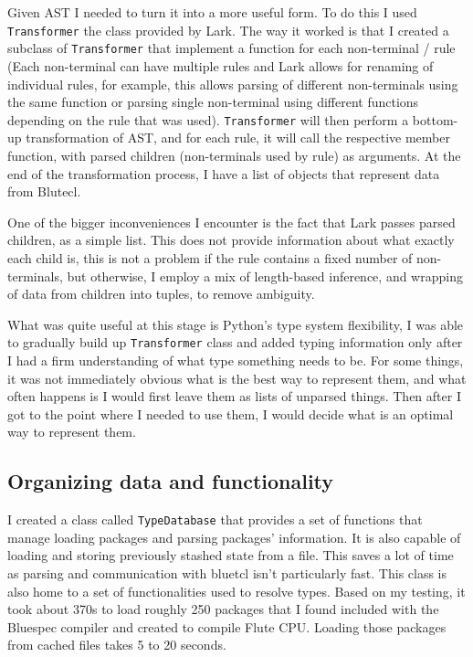 \documentclass[12pt]{report}
\begin{document}
Given AST I needed to turn it into a more useful form. To do this I used \verb!Transformer! the class provided by Lark. The way it worked is that I created a subclass of \verb!Transformer! that implement a function for each non-terminal / rule (Each non-terminal can have multiple rules and Lark allows for renaming of individual rules, for example, this allows parsing of different non-terminals using the same function or parsing single non-terminal using different functions depending on the rule that was used). \verb!Transformer! will then perform a bottom-up transformation of AST, and for each rule, it will call the respective member function, with parsed children (non-terminals used by rule) as arguments. At the end of the transformation process, I have a list of objects that represent data from Blutecl.  
\par
One of the bigger inconveniences I encounter is the fact that Lark passes parsed children, as a simple list. This does not provide information about what exactly each child is, this is not a problem if the rule contains a fixed number of non-terminals, but otherwise, I employ a mix of length-based inference, and wrapping of data from children into tuples, to remove ambiguity.  
\par
What was quite useful at this stage is Python's type system flexibility, I was able to gradually build up \verb!Transformer! class and added typing information only after I had a firm understanding of what type something needs to be. For some things, it was not immediately obvious what is the best way to represent them, and what often happens is I would first leave them as lists of unparsed things. Then after I got to the point where I needed to use them, I would decide what is an optimal way to represent them. 

\subsection{Organizing data and functionality}
I created a class called \verb!TypeDatabase! that provides a set of functions that manage loading packages and parsing packages' information. It is also capable of loading and storing previously stashed state from a  file. This saves a lot of time as parsing and communication with bluetcl isn't particularly fast. This class is also home to a set of functionalities used to resolve types. Based on my testing, it took about 370s to load roughly 250 packages that I found included with the Bluespec compiler and created to compile Flute CPU. Loading those packages from cached files takes 5 to 20 seconds.
\end{document}
